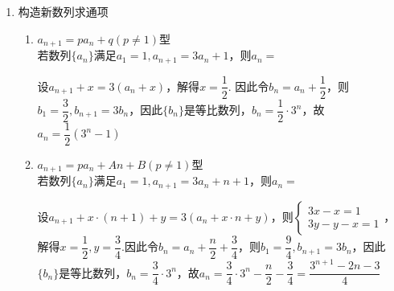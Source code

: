 \begin{enumerate}
\begin{enumerate}
        \item 在等差数列$\{a_n\}$中，$a_1, a_3, a_9$成等比数列，且公差$d$不为0，则$\dfrac{a_1 + a_3 + a_9}{a_2 + a_4 + a_{10}} = $.
        \begin{jieda}
            易知$a_n = n \cdot a_1$，故$\dfrac{a_1 + a_3 + a_9}{a_2 + a_4 + a_{10}} = \dfrac{1+3+9}{2+4+10} = \dfrac{13}{16}$，下面为严格推导：\\
            $a_1 \cdot (a_1+8d) = (a_1 + 2d)^2$，即$a_1^2 + 8a_1d = a_1^2 + 4a_1d + 4d^2$，即$a_1 = d$，故$a_n = n \cdot a_1$
        \end{jieda}
        \item 数列$\{a_n\}$既是等差数列又是等比数列，且有$a_{n+1} = \dfrac{a_n^2}{2a_n - 1}$，则数列$\{a_n\}$的前10项和为
        \begin{jieda}
            数列$\{a_n\}$既是等差数列又是等比数列即$\{a_n\}$为非零常数列，设$a_n = k$，则$k = \dfrac{k^2}{2k-1}$，故$k = 1$，因此$a_n = 1$，前10项和为10.
        \end{jieda}
    \end{enumerate}
    \item 构造新数列求通项
    \begin{enumerate}
        \item $a_{n+1} = pa_n + q (p \neq 1)$型 \\
            若数列$\{a_n\}$满足$a_1 = 1, a_{n+1} = 3a_n+1$，则$a_n = $
            \begin{jieda}
                设$a_{n+1} + x = 3(a_n + x)$，解得$x = \dfrac{1}{2}$. 因此令$b_n = a_n + \dfrac{1}{2}$，则$b_1 = \dfrac{3}{2}, b_{n+1} = 3b_n$，因此$\{b_n\}$是等比数列，$b_n = \dfrac{1}{2} \cdot 3^n$，故$a_n = \dfrac{1}{2}(3^n - 1)$ 
            \end{jieda}
        \item $a_{n+1} = pa_n + An+B (p \neq 1)$型 \\
            若数列$\{a_n\}$满足$a_1 = 1, a_{n+1} = 3a_n + n + 1$，则$a_n = $
            \begin{jieda}
                设$a_{n+1} + x \cdot (n+1) + y = 3(a_n + x \cdot n + y)$，则$\left \{\begin{array}{l}
                    3x - x = 1  \\
                    3y - y - x = 1
                \end{array} \right.$，解得$x = \dfrac{1}{2}, y = \dfrac{3}{4}$.因此令$b_n = a_n + \dfrac{n}{2} + \dfrac{3}{4}$，则$b_1 = \dfrac{9}{4}, b_{n+1} = 3b_n$，因此$\{b_n\}$是等比数列，$b_n = \dfrac{3}{4} \cdot 3^n$，故$a_n = \dfrac{3}{4} \cdot 3^n - \dfrac{n}{2} - \dfrac{3}{4} = \dfrac{3^{n+1}-2n-3}{4}$

\end{jieda}
\end{enumerate}
\end{enumerate}
